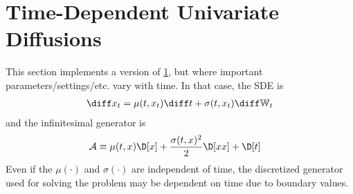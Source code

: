 \documentclass[11pt]{etk-article}
\begin{document}
\section{Time-Dependent Univariate Diffusions}\label{sec:time-dependent-univariate-diffusion}
This section implements a version of \cref{sec:time-dependent-univariate-diffusion}, but where important parameters/settings/etc. vary with time.  In that case, the SDE is
\begin{align}
	\diff x_t = \mu(t, x_t)\diff t + \sigma(t, x_t)\diff\mathbb{W}_t\label{eq:x-t-SDE}
\end{align}
and the infinitesimal generator is 
\begin{align}
	\mathcal{A} &\equiv \mu(t,x)\D[x] + \frac{\sigma(t,x)^2}{2}\D[xx] + \D[t]\label{eq:A-generator-univariate-diffusion-t}
\end{align}
Even if the $\mu(\cdot)$ and $\sigma(\cdot)$ are independent of time, the discretized generator used for solving the problem may be dependent on time due to boundary values.



\end{document}
